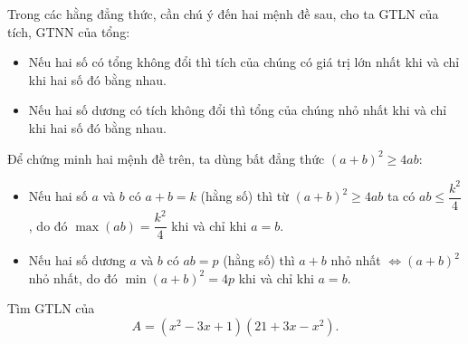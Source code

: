 \begin{note}
	Trong các hằng đẳng thức, cần chú ý đến hai mệnh đề sau, cho ta GTLN của tích, GTNN của tổng:
	\begin{itemize}
		\item Nếu hai số có tổng không đổi thì tích của chúng có giá trị lớn nhất khi và chỉ khi hai số đó bằng  nhau.
		\item Nếu hai số dương có tích không đổi thì tổng của chúng nhỏ nhất khi và chỉ khi hai số đó bằng nhau.
	\end{itemize}
Để chứng minh hai mệnh đề trên, ta dùng bất đẳng thức $ (a+b)^2\ge 4ab $:
   \begin{itemize}
   	\item Nếu hai số $ a $ và $ b $ có $ a+b=k $ (hằng số) thì từ $ (a+b)^2\ge 4ab $ ta có $ ab\le \dfrac{k^2}{4} $, do đó $ \max (ab)=\dfrac{k^2}{4} $ khi và chỉ khi $ a=b $.
   	\item Nếu hai số dương $ a $ và $ b $ có $ ab=p $ (hằng số) thì $ a+b $ nhỏ nhất $ \Leftrightarrow (a+b)^2 $ nhỏ nhất, do đó $ \min (a+b)^2 =4p$ khi và chỉ khi $ a=b $.
   \end{itemize}
\end{note}
\begin{vd}%
	Tìm GTLN của \[A=(x^2-3x+1)(21+3x-x^2).\]
\end{vd}

